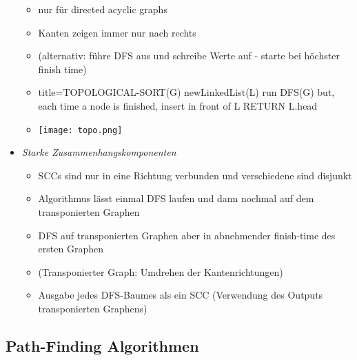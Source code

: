 \begin{itemize}
                    \begin{itemize}
                        \item nur für directed acyclic graphs
                        \item Kanten zeigen immer nur nach rechts
                        \item (alternativ: führe DFS aus und schreibe Werte auf - starte bei höchster finish time)
                        \item[]
                            \begin{ccode}[autogobble]{title={TOPOLOGICAL-SORT(G)}}
                                newLinkedList(L)
                                run DFS(G) but, each time a node is finished, insert in front of L
                                RETURN L.head
                            \end{ccode}
                        \item[] \centerline{\texttt{[image: topo.png]}}
                    \end{itemize}
                \item \textit{Starke Zusammenhangskomponenten}
                    \begin{itemize}
                        \item SCCs sind nur in eine Richtung verbunden und verschiedene sind disjunkt
                        \item Algorithmus lässt einmal DFS laufen und dann nochmal auf dem transponierten Graphen
                        \item DFS auf transponierten Graphen aber in abnehmender finish-time des ersten Graphen
                        \item[] (Transponierter Graph: Umdrehen der Kantenrichtungen)
                        \item Ausgabe jedes DFS-Baumes als ein SCC (Verwendung des Outputs transponierten Graphens)
                    \end{itemize}
            \end{itemize}

    \subsection{Path-Finding Algorithmen}
